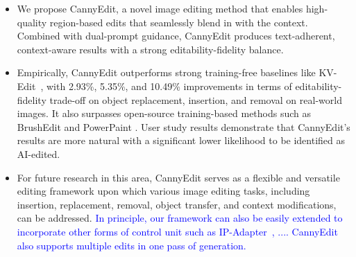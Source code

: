 \documentclass{article}
\newcommand{\kc}[1]{\textcolor{blue}{#1}}
\begin{document}
\vspace{-1mm}
\begin{itemize}[leftmargin=5mm]
\item We propose CannyEdit, a novel image editing method 
that enables high-quality region-based edits that seamlessly blend in with the context. Combined with dual-prompt guidance, CannyEdit produces text-adherent, context-aware results with a strong editability-fidelity balance.

\vspace{-1mm}

\item Empirically, CannyEdit outperforms strong training-free baselines like KV-Edit~\citep{zhu2025kv}, with 2.93\%, 5.35\%, and 10.49\% improvements in terms of editability-fidelity trade-off on object replacement, insertion, and removal on real-world images. It also surpasses open-source training-based methods such as BrushEdit \citep{li2024brushedit} and PowerPaint \citep{zhuang2023task}. User study results demonstrate that CannyEdit's results are more natural with a significant lower likelihood to be identified as AI-edited.  %

\vspace{-1mm}

\item For future research in this area, CannyEdit serves as a flexible and versatile editing framework upon which various image editing tasks, including insertion, replacement, removal, object transfer, and context modifications, can be addressed. 
\kc{In principle, our framework can also be easily extended to incorporate other forms of control unit such as IP-Adapter~\cite{}, .... CannyEdit also supports multiple edits in one pass of generation.} 

\end{itemize}
\end{document}
